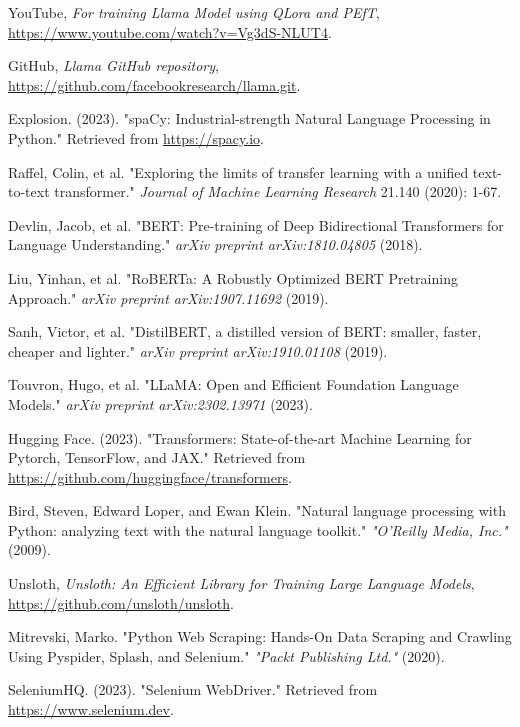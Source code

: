 \documentclass[conference]{IEEEtran}
\begin{document}
\begin{thebibliography}{1}
    YouTube, \emph{For training Llama Model using QLora and PEfT}, \href{https://www.youtube.com/watch?v=Vg3dS-NLUT4}{https://www.youtube.com/watch?v=Vg3dS-NLUT4}.

    GitHub, \emph{Llama GitHub repository}, \href{https://github.com/facebookresearch/llama.git}{https://github.com/facebookresearch/llama.git}.

    Explosion. (2023). "spaCy: Industrial-strength Natural Language Processing in Python." Retrieved from \url{https://spacy.io}.

    Raffel, Colin, et al. "Exploring the limits of transfer learning with a unified text-to-text transformer." \emph{Journal of Machine Learning Research} 21.140 (2020): 1-67.

    Devlin, Jacob, et al. "BERT: Pre-training of Deep Bidirectional Transformers for Language Understanding." \emph{arXiv preprint arXiv:1810.04805} (2018).

    Liu, Yinhan, et al. "RoBERTa: A Robustly Optimized BERT Pretraining Approach." \emph{arXiv preprint arXiv:1907.11692} (2019).

    Sanh, Victor, et al. "DistilBERT, a distilled version of BERT: smaller, faster, cheaper and lighter." \emph{arXiv preprint arXiv:1910.01108} (2019).

    Touvron, Hugo, et al. "LLaMA: Open and Efficient Foundation Language Models." \emph{arXiv preprint arXiv:2302.13971} (2023).

    Hugging Face. (2023). "Transformers: State-of-the-art Machine Learning for Pytorch, TensorFlow, and JAX." Retrieved from \url{https://github.com/huggingface/transformers}.

    Bird, Steven, Edward Loper, and Ewan Klein. "Natural language processing with Python: analyzing text with the natural language toolkit." \emph{"O'Reilly Media, Inc."} (2009).

    Unsloth, \emph{Unsloth: An Efficient Library for Training Large Language Models}, \href{https://github.com/unsloth/unsloth}{https://github.com/unsloth/unsloth}.

    Mitrevski, Marko. "Python Web Scraping: Hands-On Data Scraping and Crawling Using Pyspider, Splash, and Selenium." \emph{"Packt Publishing Ltd."} (2020).

    SeleniumHQ. (2023). "Selenium WebDriver." Retrieved from \url{https://www.selenium.dev}.


\end{thebibliography}
\end{document}
